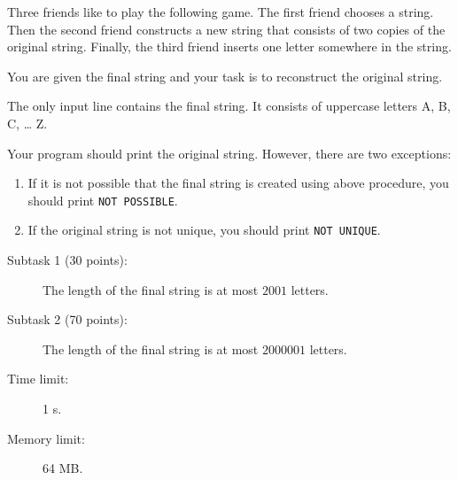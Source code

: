 \documentclass{boi2014}
\begin{document}
    Three friends like to play the following game.
    The first friend chooses a string.
    Then the second friend constructs a new string that consists of
    two copies of the original string. 
    Finally, the third friend inserts one letter somewhere in the string.

    \Task
    You are given the final string and your task is to reconstruct the original
    string.

    \Input
    The only input line contains the final string. It consists of
    uppercase letters A, B, C, \ldots{} Z.

    \Output
    Your program should print the original string.
    However, there are two exceptions:
    \begin{enumerate}
        \item If it is not possible that the final string is created using above
        procedure, you should print {\tt NOT POSSIBLE}.
        \item If the original string is not unique, you should print {\tt NOT
        UNIQUE}.
    \end{enumerate}
    

    \Examples


    \Scoring

    \begin{description}
        \item[Subtask 1 (30 points):] The length of the final string is at
        most $2001$ letters.
        \item[Subtask 2 (70 points):] The length of the final string is at
        most $2000001$ letters.
    \end{description}

    \Constraints

    \begin{description}
        \item[Time limit:] 1 s.
        \item[Memory limit:] 64 MB.
    \end{description}
\end{document}
